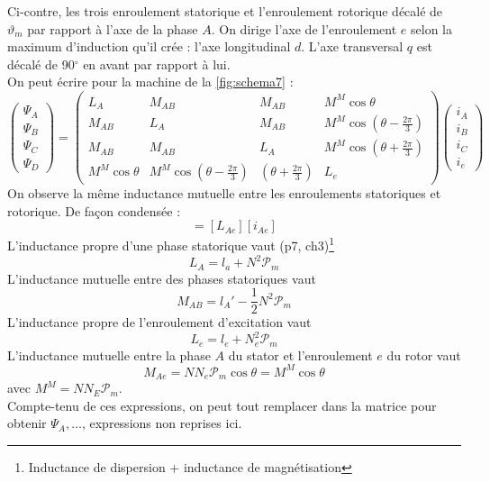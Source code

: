 	Ci-contre, les trois enroulement statorique et l'enroulement rotorique 
	décalé de $\vartheta_m$ par rapport à l'axe de la phase $A$. On dirige 
	l'axe de l'enroulement $e$ selon la maximum d'induction qu'il crée : 
	l'axe longitudinal $d$. L'axe transversal $q$ est décalé de 90$^\circ$ 
	en avant par rapport à lui.\\
	On peut écrire pour la machine de la \autoref{fig:schema7} :
	\begin{equation}
	\left(\begin{array}{c}
	\Psi_A\\
	\Psi_B\\
	\Psi_C\\
	\Psi_D
	\end{array}\right) = \left(\begin{array}{cccc}
	L_A & M_{AB} & M_{AB} & M^M\cos\theta\\
	M_{AB} & L_A & M_{AB} & M^M\cos(\theta-\frac{2\pi}{3})\\
	M_{AB} & M_{AB} & L_A & M^M\cos(\theta+\frac{2\pi}{3})\\
	M^M\cos\theta & M^M\cos(\theta-\frac{2\pi}{3}) & (\theta+\frac{2\pi}{3}) & L_e
	\end{array}\right)\left(\begin{array}{c}
	i_A\\
	i_B\\
	i_C\\
	i_e
	\end{array}\right)
	\end{equation}
	On observe la même inductance mutuelle entre les enroulements statoriques 
	et rotorique. De façon condensée :
	\begin{equation}
	[\Psi_{Ae}] = [L_{Ae}][i_{Ae}]
	\end{equation}
	L'inductance propre d'une phase statorique vaut (p7, ch3)\footnote{Inductance 
	de dispersion + inductance de magnétisation}
	\begin{equation}
	L_A = l_a + N^2\mathcal{P}_m
	\end{equation}
	L'inductance mutuelle entre des phases statoriques vaut
	\begin{equation}
	M_{AB} = l_A' - \frac{1}{2}N^2\mathcal{P}_m
	\end{equation}
	L'inductance propre de l'enroulement d'excitation vaut 
	\begin{equation}
	L_e = l_e + N_e^2 \mathcal{P}_m
	\end{equation}
	L'inductance mutuelle entre la phase $A$ du stator et l'enroulement $e$ du 
	rotor vaut
	\begin{equation}
	M_{Ae} = NN_e\mathcal{P}_m\cos\theta = M^M\cos\theta
	\end{equation}
	avec $M^M = NN_E\mathcal{P}_m$.\\
	Compte-tenu de ces expressions, on peut tout remplacer dans la matrice pour 
	obtenir $\Psi_A, \dots$, expressions non reprises ici. 
	
